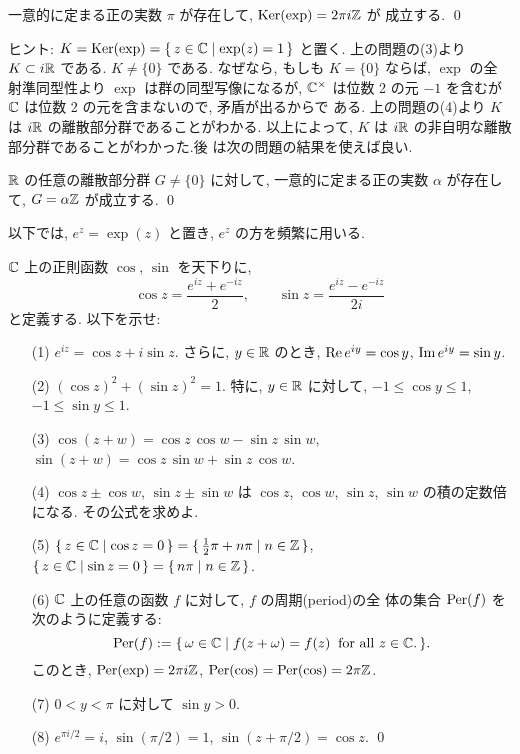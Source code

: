 \documentclass[12pt,twoside]{jarticle}
\def\Per{\mathop{\text{\rm Per}}\nolimits}
\def\Z{{\Bbb Z}} %
\def\R{{\Bbb R}} %
\def\C{{\Bbb C}} %
\def\Repart{\mathop{\text{\rm Re}}\nolimits} %
\def\Impart{\mathop{\text{\rm Im}}\nolimits} %
\def\Ker{\mathop{\text{\rm Ker}}\nolimits}   %
\begin{document}
\begin{question}[$\pi$ の定義]\label{q:defpi}
  一意的に定まる正の実数 $\pi$ が存在して, $\Ker(\exp) = 2\pi i\Z$ が
  成立する. \qed
\end{question}

\noindent ヒント: $K=\Ker(\exp)=\{\,z\in\C\mid\exp(z)=1\,\}$ と置く. %
上の問題の(3)より $K\subset i\R$ である. %
$K \ne \{0\}$ である. なぜなら, もしも $K = \{0\}$ ならば, $\exp$ の全
射準同型性より $\exp$ は群の同型写像になるが, $\C^{\times}$ は位数 2 
の元 $-1$ を含むが $\C$ は位数 2 の元を含まないので, 矛盾が出るからで
ある. 上の問題の(4)より $K$ は $i\R$ の離散部分群であることがわかる. 
以上によって, $K$ は $i\R$ の非自明な離散部分群であることがわかった.後
は次の問題の結果を使えば良い.

\begin{question}
  $\R$ の任意の離散部分群 $G\ne\{0\}$ に対して, %
  一意的に定まる正の実数 $\alpha$ が存在して, $G=\alpha\Z$ が成立する.
  \qed
\end{question}

以下では, $e^z = \exp(z)$ と置き, $e^z$ の方を頻繁に用いる.

\begin{question}
  $\C$ 上の正則函数 $\cos$, $\sin$ を天下りに,
  \[
    \cos z = \frac{e^{iz} + e^{-iz}}{2},
    \qquad
    \sin z = \frac{e^{iz} - e^{-iz}}{2i}
  \]
  と定義する.  以下を示せ:
  \begin{enumerate}
  \item[(1)] $e^{iz} = \cos z + i \sin z$. さらに, $y\in\R$ のとき,
    $\Repart e^{iy} = \cos y$, $\Impart e^{iy}=\sin y$.
  \item[(2)] $(\cos z)^2 + (\sin z)^2 = 1$. 特に, $y\in\R$ に対して,
    $-1\le \cos y \le 1$, $-1 \le \sin y \le 1$.
  \item[(3)] $\cos(z+w)=\cos z\,\cos w - \sin z\,\sin w$,
    \quad $\sin(z+w)=\cos z\,\sin w + \sin z\,\cos w$.
  \item[(4)] $\cos z \pm \cos w$, $\sin z \pm \sin w$ は $\cos z$,
    $\cos w$, $\sin z$, $\sin w$ の積の定数倍になる. その公式を求めよ.
  \item[(5)] %
    \(
      \{\,z\in\C\mid \cos z = 0\,\}
      = \{\,\frac{1}{2}\pi + n\pi \mid n\in\Z \,\}
    \), \quad
    \(
      \{\,z\in\C\mid \sin z = 0\,\}
      = \{\, n\pi \mid n\in\Z \,\}
    \).
  \item[(6)] $\C$ 上の任意の函数 $f$ に対して, $f$ の周期(period)の全
    体の集合 $\Per(f)$ を次のように定義する:
    \[
      \Per(f) :=
      \{\, \omega\in\C \mid 
        f(z+\omega)=f(z) \;\;\text{for all $z\in\C$}. \,\}.
    \]
    このとき, $\Per(\exp)=2\pi i\Z$, $\Per(\cos)=\Per(\cos)=2\pi\Z$.
  \item[(7)] $0<y<\pi$ に対して $\sin y > 0$.
  \item[(8)] %
    $e^{\pi i/2} = i$, \quad
    $\sin(\pi/2)=1$,\quad
    $\sin(z+\pi/2)=\cos z$.
  \qed
  \end{enumerate}
\end{question}
\end{document}

